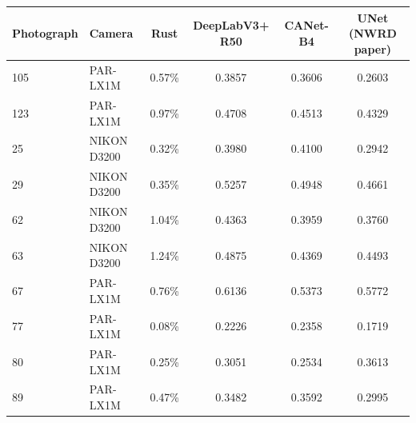 \begin{tabular}{llcccc}
\toprule
Photograph & Camera & Rust & DeepLabV3+ R50 & CANet-B4 & UNet (NWRD paper) \\
\midrule
105 & PAR-LX1M & 0.57\% & 0.3857 & 0.3606 & 0.2603 \\
123 & PAR-LX1M & 0.97\% & 0.4708 & 0.4513 & 0.4329 \\
25 & NIKON D3200 & 0.32\% & 0.3980 & 0.4100 & 0.2942 \\
29 & NIKON D3200 & 0.35\% & 0.5257 & 0.4948 & 0.4661 \\
62 & NIKON D3200 & 1.04\% & 0.4363 & 0.3959 & 0.3760 \\
63 & NIKON D3200 & 1.24\% & 0.4875 & 0.4369 & 0.4493 \\
67 & PAR-LX1M & 0.76\% & 0.6136 & 0.5373 & 0.5772 \\
77 & PAR-LX1M & 0.08\% & 0.2226 & 0.2358 & 0.1719 \\
80 & PAR-LX1M & 0.25\% & 0.3051 & 0.2534 & 0.3613 \\
89 & PAR-LX1M & 0.47\% & 0.3482 & 0.3592 & 0.2995 \\
\bottomrule
\end{tabular}
